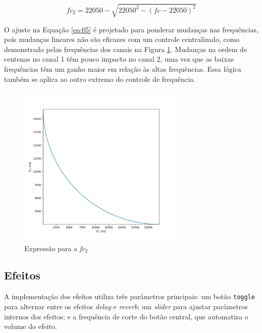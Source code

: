 \begin{equation}  \label{eq:05}
    fc_2 = 22050 - \sqrt{22050^2 - (fc - 22050)^2}
\end{equation}

O ajuste na Equação \ref{eq:05} é projetado para ponderar mudanças nas frequências, pois mudanças lineares não são eficazes com um controle centralizado, como demonstrado pelas frequências dos canais na Figura \ref{fig45}.
Mudanças na ordem de centenas no canal 1 têm pouco impacto no canal 2, uma vez que as baixas frequências têm um ganho maior em relação às altas frequências. Essa lógica também se aplica ao outro extremo do controle de frequência.

\begin{figure}[h]
    \centering
    \includegraphics[width=0.7\textwidth]{figuras/fig45.png}
    \caption{Expressão para a \textit{fc$_{2}$}}
    \label{fig45}
\end{figure}


\subsection{Efeitos}

A implementação dos efeitos utiliza três parâmetros principais: um botão \texttt{toggle} para alternar entre os efeitos \textit{delay} e \textit{reverb}; um \textit{slider} para ajustar parâmetros internos dos efeitos; e a frequência de corte do botão central, que automatiza o volume do efeito.

